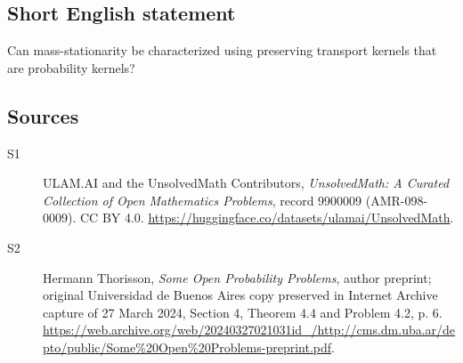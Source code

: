 \documentclass[11pt]{article}
\begin{document}
\subsection{Short English statement}
Can mass-stationarity be characterized using preserving transport kernels that are probability kernels?
\subsection{Sources}
\begin{description}
\item[\hypertarget{source:9900009:1}{S1}] ULAM.AI and the UnsolvedMath Contributors, \emph{UnsolvedMath: A Curated Collection of Open Mathematics Problems}, record 9900009 (AMR-098-0009). CC BY 4.0. \url{https://huggingface.co/datasets/ulamai/UnsolvedMath}.
\item[\hypertarget{source:9900009:2}{S2}] Hermann Thorisson, \emph{Some Open Probability Problems}, author preprint; original Universidad de Buenos Aires copy preserved in Internet Archive capture of 27 March 2024, Section 4, Theorem 4.4 and Problem 4.2, p. 6. \url{https://web.archive.org/web/20240327021031id_/http://cms.dm.uba.ar/depto/public/Some%20Open%20Problems-preprint.pdf}.
\end{description}
\label{end:9900009}
\end{document}
